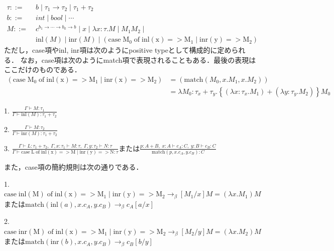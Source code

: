 \documentclass[uplatex, dvipdfmx]{jsreport}
\begin{document}
\begin{definition}
    \begin{align*}
        \tau ::=&\; b\mid \tau_1\to\tau_2 \mid \tau_1+\tau_2 \\
        b ::=&\; int\mid bool\mid\cdots \\
        M ::=&\; c^{b_1\to\cdots\to b_k\to b}\mid x\mid \lambda x:\tau.M\mid M_1M_2 \mid\\
        &\; \mathrm{inl}(M)\mid\mathrm{inr}(M)\mid \left( \mathrm{case\;M_0\;of\;inl(x)=>M_1\mid inr(y)=>M_2} \right)
    \end{align*}
    ただし，case項やinl, inr項は次のようにpositive typeとして構成的に定められる．
    なお，case項は次のようにmatch項で表現されることもある．最後の表現はここだけのものである．
    \begin{align*}
        \left( \mathrm{case\;M_0\;of\;inl(x)=>M_1\mid inr(x)=>M_2} \right) &= \left( \mathrm{match}(M_0,x.M_1,x.M_2) \right)\\
        &= \lambda M_0:\tau_x+\tau_y.\left\{ (\lambda x:\tau_x.M_1)+(\lambda y:\tau_y.M_2) \right\}M_0
    \end{align*}

    1. $\frac{\Gamma\vdash M:\tau_1}{\Gamma\vdash\mathrm{inl}(M):\tau_1+\tau_2}$

    2. $\frac{\Gamma\vdash M:\tau_2}{\Gamma\vdash\mathrm{inr}(M):\tau_1+\tau_2}$

    3. $\frac{\Gamma\vdash L:\tau_1+\tau_2, \;\Gamma,x:\tau_1\vdash M:\tau, \;\Gamma,y:\tau_2\vdash N:\tau}{\Gamma\vdash \mathrm{case\;L\;of\;inl(x)=>M\mid inr(y)=>N}:\tau }$または$\frac{p:A+B,\;x:A\vdash c_A:C,\;y:B\vdash c_B:C}{\mathrm{match}(p,x.c_A,y.c_B):C}$

    また，case項の簡約規則は次の通りである．

    1. $\mathrm{case\;inl(M)\;of\;inl(x)=>M_1\mid inr(y)=>M_2} \to_\beta [M_1/x]M=(\lambda x.M_1)M$または$\mathrm{match}(\mathrm{inl}(a),x.c_A,y.c_B)\to_\beta c_A[a/x]$

    2. $\mathrm{case\;inr(M)\;of\;inl(x)=>M_1\mid inr(y)=>M_2} \to_\beta [M_2/y]M=(\lambda x.M_2)M$または$\mathrm{match}(\mathrm{inr}(b),x.c_A,y.c_B)\to_\beta c_B[b/y]$
\end{definition}
\end{document}
